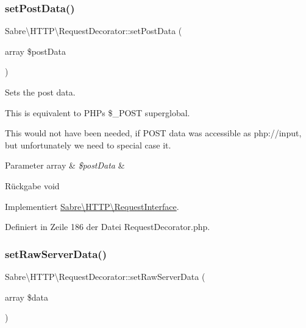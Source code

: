 \subsubsection{\texorpdfstring{set\+Post\+Data()}{setPostData()}}
{\footnotesize\ttfamily Sabre\textbackslash{}\+H\+T\+T\+P\textbackslash{}\+Request\+Decorator\+::set\+Post\+Data (\begin{DoxyParamCaption}\item[{array}]{\$post\+Data }\end{DoxyParamCaption})}

Sets the post data.

This is equivalent to P\+HP\textquotesingle{}s \$\+\_\+\+P\+O\+ST superglobal.

This would not have been needed, if P\+O\+ST data was accessible as php\+://input, but unfortunately we need to special case it.


\begin{DoxyParams}[1]{Parameter}
array & {\em \$post\+Data} & \\
\hline
\end{DoxyParams}
\begin{DoxyReturn}{Rückgabe}
void 
\end{DoxyReturn}


Implementiert \mbox{\hyperlink{interface_sabre_1_1_h_t_t_p_1_1_request_interface_a4ba8b65d991c82677688a785a9d4014a}{Sabre\textbackslash{}\+H\+T\+T\+P\textbackslash{}\+Request\+Interface}}.



Definiert in Zeile 186 der Datei Request\+Decorator.\+php.

\mbox{\label{class_sabre_1_1_h_t_t_p_1_1_request_decorator_acaa7bf6e2566bd2c554dc8f589c93f51}} 
\subsubsection{\texorpdfstring{set\+Raw\+Server\+Data()}{setRawServerData()}}
{\footnotesize\ttfamily Sabre\textbackslash{}\+H\+T\+T\+P\textbackslash{}\+Request\+Decorator\+::set\+Raw\+Server\+Data (\begin{DoxyParamCaption}\item[{array}]{\$data }\end{DoxyParamCaption})}

